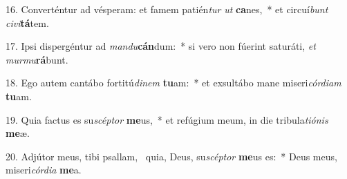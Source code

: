 16. Converténtur ad vésperam: et famem patién\textit{tur} \textit{ut} \textbf{ca}nes,~*  et circuí\textit{bunt} \textit{ci}\textit{vi}\textbf{tá}tem.\

17. Ipsi dispergéntur ad \textit{man}\textit{du}\textbf{cán}dum:~*  si vero non fúerint saturáti, \textit{et} \textit{mur}\textit{mu}\textbf{rá}bunt.\

18. Ego autem cantábo fortitú\textit{di}\textit{nem} \textbf{tu}am:~*  et exsultábo mane miseri\textit{cór}\textit{di}\textit{am} \textbf{tu}am.\

19. Quia factus es su\textit{scép}\textit{tor} \textbf{me}us,~*  et refúgium meum, in die tribula\textit{ti}\textit{ó}\textit{nis} \textbf{me}æ.\

20. Adjútor meus, tibi psallam, \dag\  quia, Deus, su\textit{scép}\textit{tor} \textbf{me}us es:~*  Deus meus, miseri\textit{cór}\textit{di}\textit{a} \textbf{me}a.\

